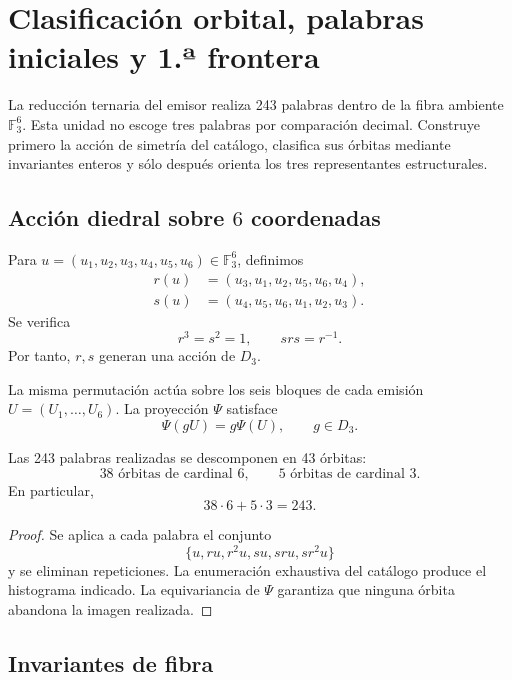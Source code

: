 
\chapter{Clasificación orbital, palabras iniciales y 1.ª frontera}
\label{chap:orbitas-elevacion-r36}

La reducción ternaria del emisor realiza 243 palabras dentro de la fibra
ambiente \(\mathbb F_3^6\). Esta unidad no escoge tres palabras por
comparación decimal. Construye primero la acción de simetría del catálogo,
clasifica sus órbitas mediante invariantes enteros y sólo después orienta
los tres representantes estructurales.

\section{Acción diedral sobre \(6\) coordenadas}

Para \(u=(u_1,u_2,u_3,u_4,u_5,u_6)\in\mathbb F_3^6\), definimos
\begin{align*}
 r(u)&=(u_3,u_1,u_2,u_5,u_6,u_4),\\
 s(u)&=(u_4,u_5,u_6,u_1,u_2,u_3).
\end{align*}
Se verifica
\[
 r^3=s^2=1,
 \qquad srs=r^{-1}.
\]
Por tanto, \(r,s\) generan una acción de \(D_3\).

La misma permutación actúa sobre los seis bloques de cada emisión
\(U=(U_1,\ldots,U_6)\). La proyección \(\Psi\) satisface
\[
 \Psi(gU)=g\Psi(U),
 \qquad g\in D_3.
\]

\begin{theorem}
\label{thm:catalogo-descomposicion-d3}
Las 243 palabras realizadas se descomponen en 43 órbitas:
\[
 38\text{ órbitas de cardinal }6,
 \qquad
 5\text{ órbitas de cardinal }3.
\]
En particular,
\[
 38\cdot6+5\cdot3=243.
\]
\end{theorem}

\begin{proof}
Se aplica a cada palabra el conjunto
\[
 \{u,ru,r^2u,su,sru,sr^2u\}
\]
y se eliminan repeticiones. La enumeración exhaustiva del catálogo produce
el histograma indicado. La equivariancia de \(\Psi\) garantiza que ninguna
órbita abandona la imagen realizada.
\end{proof}

\section{Invariantes de fibra}

